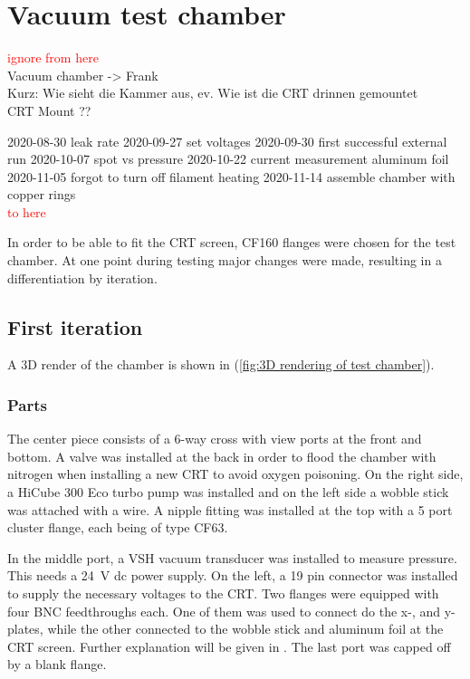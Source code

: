 
\chapter{Vacuum test chamber}
\label{chap:Vacuum chamber}

\textcolor{red}{ignore from here} \\
Vacuum chamber -> Frank \\
Kurz: Wie sieht die Kammer aus, ev. Wie ist die CRT drinnen gemountet \\
CRT Mount ??


2020-08-30 leak rate
2020-09-27 set voltages
2020-09-30 first successful external run
2020-10-07 spot vs pressure
2020-10-22 current measurement aluminum foil
2020-11-05 forgot to turn off filament heating
2020-11-14 assemble chamber with copper rings \\
\textcolor{red}{to here}

In order to be able to fit the CRT screen, CF160 flanges were chosen for the test chamber. At one point during testing major changes were made, resulting in a differentiation by iteration.

\section{First iteration}
\label{sec:vacuum chamber first iteration}

A 3D render of the chamber is shown in  (\cref{fig:3D rendering of test chamber}).
 
\subsection{Parts}
\label{subsec:Parts}
 
The center piece consists of a 6-way cross with view ports at the front and bottom. A valve was installed at the back in order to flood the chamber with nitrogen when installing a new CRT to avoid oxygen poisoning. On the right side, a HiCube 300 Eco turbo pump was installed and on the left side a wobble stick was attached with a wire. A nipple fitting  was installed at the top with a 5 port cluster flange, each being of type CF63.
 
In the middle port, a VSH vacuum transducer was installed to measure pressure. This needs a \SI{24}{\volt} dc power supply. On the left, a 19 pin connector  was installed to supply the necessary voltages to the CRT. Two flanges were equipped with four BNC feedthroughs each. One of them was used to connect do the x-, and y-plates, while the other connected to the wobble stick and aluminum foil at the CRT screen. Further explanation will be given in . The last port was capped off by a blank flange.
 
